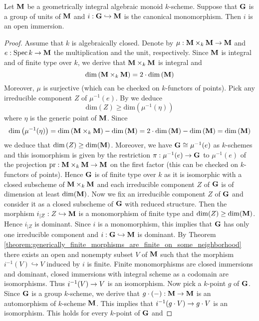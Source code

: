 \begin{theorem}\label{theorem:units_are_open_in_a_geometrically_integral_monoid}
Let $\mathbf{M}$ be a geometrically integral algebraic monoid $k$-scheme. Suppose that $\mathbf{G}$ is a group of units of $\mathbf{M}$ and $i:\mathbf{G}\hookrightarrow \mathbf{M}$ is the canonical monomorphism. Then $i$ is an open immersion.
\end{theorem}
\begin{proof}
Assume that $k$ is algebraically closed. Denote by $\mu:\mathbf{M}\times_k\mathbf{M}\rightarrow \mathbf{M}$ and $e:\mathrm{Spec}\, k\rightarrow \mathbf{M}$ the multiplication and the unit, respectively. Since $\mathbf{M}$ is integral and of finite type over $k$, we derive that $\mathbf{M}\times_k\mathbf{M}$ is integral and
$$\mathrm{dim}\left(\mathbf{M}\times_k\mathbf{M}\right) = 2\cdot \mathrm{dim}\left(\mathbf{M}\right)$$
Moreover, $\mu$ is surjective (which can be checked on $k$-functors of points). Pick any irreducible component $Z$ of $\mu^{-1}(e)$. By {\cite[Lemma 14.109]{gortz2010algebraic}} we deduce $$\mathrm{dim}\left(Z\right) \geq \mathrm{dim}\left(\mu^{-1}(\eta)\right)$$
where $\eta$ is the generic point of $\mathbf{M}$. Since 
$$\mathrm{dim}\left(\mu^{-1}(\eta)\right) = \mathrm{dim}\left(\mathbf{M}\times_k\mathbf{M}\right) - \mathrm{dim}\left(\mathbf{M}\right) =  2\cdot \mathrm{dim}\left(\mathbf{M}\right) - \mathrm{dim}\left(\mathbf{M}\right) = \mathrm{dim}\left(\mathbf{M}\right)$$
we deduce that $\mathrm{dim}\left(Z\right) \geq \mathrm{dim}(\mathbf{M})$. Moreover, we have $\mathbf{G} \cong \mu^{-1}(e)$ as $k$-schemes and this isomorphism is given by the restriction $\pi:\mu^{-1}(e)\rightarrow \mathbf{G}$ to $\mu^{-1}(e)$ of the projection $\mathrm{pr}:\mathbf{M}\times_k\mathbf{M}\rightarrow \mathbf{M}$ on the first factor (this can be checked on $k$-functors of points). Hence $\mathbf{G}$ is of finite type over $k$ as it is isomorphic with a closed subscheme of $\mathbf{M}\times_k\mathbf{M}$ and each irreducible component $Z$ of $\mathbf{G}$ is of dimension at least $ \mathrm{dim}(\mathbf{M})$. Now we fix an irreducible component $Z$ of $\mathbf{G}$ and consider it as a closed subscheme of $\mathbf{G}$ with reduced structure. Then the morphism $i_{\mid Z}:Z\hookrightarrow \mathbf{M}$ is a monomorphism of finite type and $\mathrm{dim}(Z) \geq \mathrm{dim}(\mathbf{M})$. Hence $i_{\mid Z}$ is dominant. Since $i$ is a monomorphism, this implies that $\mathbf{G}$ has only one irreducible component and $i:\mathbf{G}\hookrightarrow \mathbf{M}$ is dominant. By Theorem \ref{theorem:generically_finite_morphisms_are_finite_on_some_neighborhood} there exists an open and nonempty subset $V$ of $\mathbf{M}$ such that the morphism $i^{-1}(V)\hookrightarrow V$ induced by $i$ is finite. Finite monomorphisms are closed immersions and dominant, closed immersions with integral scheme as a codomain are isomorphisms. Thus $i^{-1}(V)\rightarrow V$ is an isomorphism. Now pick a $k$-point $g$ of $\mathbf{G}$. Since $\mathbf{G}$ is a group $k$-scheme, we derive that $g\cdot (-):\mathbf{M}\rightarrow \mathbf{M}$ is an automorphism of $k$-scheme $\mathbf{M}$. This implies that $i^{-1}(g \cdot V)\rightarrow g\cdot V$ is an isomorphism. This holds for every $k$-point of $\mathbf{G}$ and 

\end{proof}
